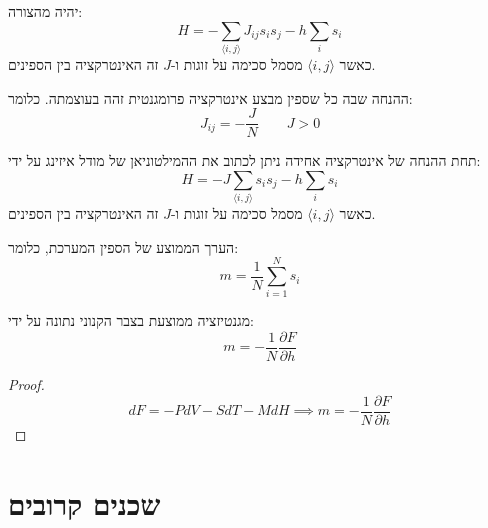 \documentclass{tstextbook}
\begin{document}
\begin{definition}
יהיה מהצורה:
$$H=-\sum_{\langle i,j\rangle}J_{ij}s_{i}s_{j}-h\sum_{i}s_{i}$$
כאשר \(\langle i,j \rangle\) מסמל סכימה על זוגות ו-\(J\) זה האינטרקציה בין הספינים.

\end{definition}
\begin{definition}
ההנחה שבה כל שספין מבצע אינטרקציה פרומגנטית זהה בעוצמתה. כלומר:
$$J_{i j}=-\frac{J}{N}\qquad J> 0$$

\end{definition}
\begin{corollary}
תחת ההנחה של אינטרקציה אחידה ניתן לכתוב את ההמילטוניאן של מודל איזינג על ידי:
$$H=-J\sum_{\langle i,j\rangle}s_{i}s_{j}-h\sum_{i}s_{i}$$
כאשר \(\langle i,j \rangle\) מסמל סכימה על זוגות ו-\(J\) זה האינטרקציה בין הספינים.

\end{corollary}
\begin{definition}
הערך הממוצע של הספין המערכת, כלומר:
$$m=\frac{1}{N}\sum_{i=1}^{N}s_{i}$$

\end{definition}
\begin{corollary}
מגנטיזציה ממוצעת בצבר הקנוני נתונה על ידי:
$$m=-\frac{1}{N}\frac{\partial F}{\partial h} $$

\end{corollary}
\begin{proof}
$$d F=-P d V-S d T-M d H\implies m=-\frac{1}{N}\frac{\partial F}{\partial h}$$

\end{proof}
\section{שכנים קרובים}
\end{document}
